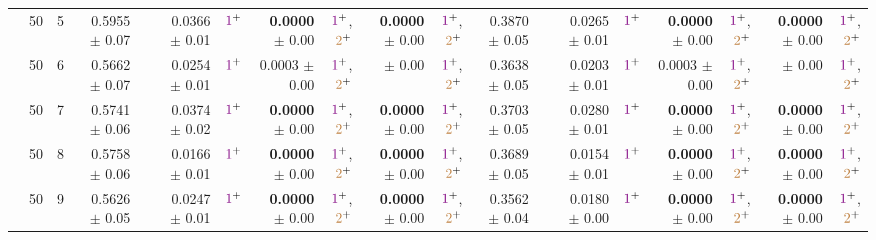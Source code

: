 \begin{table}
\begin{tiny}
\begin{tabular}[t]{rrrrrrrrrrrrrrrrrrr}
 & 50 & 5 & 0.5955 $\pm$ 0.07 &  & 0.0366 $\pm$ 0.01 & $\textcolor{violet}{1}^{+}$ & \textbf{0.0000} $\pm$ 0.00 & $\textcolor{violet}{1}^{+}$,$\textcolor{brown}{2}^{+}$ & \textbf{0.0000} $\pm$ 0.00 & $\textcolor{violet}{1}^{+}$,$\textcolor{brown}{2}^{+}$ & 0.3870 $\pm$ 0.05 &  & 0.0265 $\pm$ 0.01 & $\textcolor{violet}{1}^{+}$ & \textbf{0.0000} $\pm$ 0.00 & $\textcolor{violet}{1}^{+}$,$\textcolor{brown}{2}^{+}$ & \textbf{0.0000} $\pm$ 0.00 & $\textcolor{violet}{1}^{+}$,$\textcolor{brown}{2}^{+}$\\

 & 50 & 6 & 0.5662 $\pm$ 0.07 &  & 0.0254 $\pm$ 0.01 & $\textcolor{violet}{1}^{+}$ & 0.0003 $\pm$ 0.00 & $\textcolor{violet}{1}^{+}$,$\textcolor{brown}{2}^{+}$ & \cellcolor{gray!0}{\textbf{0.0000}} $\pm$ 0.00 & $\textcolor{violet}{1}^{+}$,$\textcolor{brown}{2}^{+}$ & 0.3638 $\pm$ 0.05 &  & 0.0203 $\pm$ 0.01 & $\textcolor{violet}{1}^{+}$ & 0.0003 $\pm$ 0.00 & $\textcolor{violet}{1}^{+}$,$\textcolor{brown}{2}^{+}$ & \cellcolor{gray!0}{\textbf{0.0000}} $\pm$ 0.00 & $\textcolor{violet}{1}^{+}$,$\textcolor{brown}{2}^{+}$\\

 & 50 & 7 & 0.5741 $\pm$ 0.06 &  & 0.0374 $\pm$ 0.02 & $\textcolor{violet}{1}^{+}$ & \textbf{0.0000} $\pm$ 0.00 & $\textcolor{violet}{1}^{+}$,$\textcolor{brown}{2}^{+}$ & \textbf{0.0000} $\pm$ 0.00 & $\textcolor{violet}{1}^{+}$,$\textcolor{brown}{2}^{+}$ & 0.3703 $\pm$ 0.05 &  & 0.0280 $\pm$ 0.01 & $\textcolor{violet}{1}^{+}$ & \textbf{0.0000} $\pm$ 0.00 & $\textcolor{violet}{1}^{+}$,$\textcolor{brown}{2}^{+}$ & \textbf{0.0000} $\pm$ 0.00 & $\textcolor{violet}{1}^{+}$,$\textcolor{brown}{2}^{+}$\\

 & 50 & 8 & 0.5758 $\pm$ 0.06 &  & 0.0166 $\pm$ 0.01 & $\textcolor{violet}{1}^{+}$ & \textbf{0.0000} $\pm$ 0.00 & $\textcolor{violet}{1}^{+}$,$\textcolor{brown}{2}^{+}$ & \textbf{0.0000} $\pm$ 0.00 & $\textcolor{violet}{1}^{+}$,$\textcolor{brown}{2}^{+}$ & 0.3689 $\pm$ 0.05 &  & 0.0154 $\pm$ 0.01 & $\textcolor{violet}{1}^{+}$ & \textbf{0.0000} $\pm$ 0.00 & $\textcolor{violet}{1}^{+}$,$\textcolor{brown}{2}^{+}$ & \textbf{0.0000} $\pm$ 0.00 & $\textcolor{violet}{1}^{+}$,$\textcolor{brown}{2}^{+}$\\

 & 50 & 9 & 0.5626 $\pm$ 0.05 &  & 0.0247 $\pm$ 0.01 & $\textcolor{violet}{1}^{+}$ & \textbf{0.0000} $\pm$ 0.00 & $\textcolor{violet}{1}^{+}$,$\textcolor{brown}{2}^{+}$ & \textbf{0.0000} $\pm$ 0.00 & $\textcolor{violet}{1}^{+}$,$\textcolor{brown}{2}^{+}$ & 0.3562 $\pm$ 0.04 &  & 0.0180 $\pm$ 0.00 & $\textcolor{violet}{1}^{+}$ & \textbf{0.0000} $\pm$ 0.00 & $\textcolor{violet}{1}^{+}$,$\textcolor{brown}{2}^{+}$ & \textbf{0.0000} $\pm$ 0.00 & $\textcolor{violet}{1}^{+}$,$\textcolor{brown}{2}^{+}$\\


\end{tabular}
\end{tiny}
\end{table}

